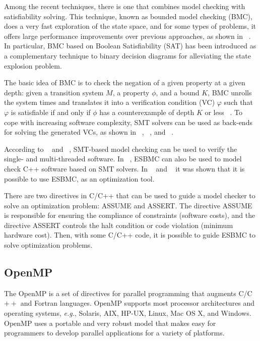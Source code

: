 Among the recent techniques, there is one that combines model checking with satisﬁability solving. This technique, known as bounded model checking (BMC), does a very fast exploration of the state space, and for some types of problems, it offers large performance improvements over previous approaches, as shown in ~\cite{Biere2009}. In particular, BMC based on Boolean Satisfiability (SAT) has been introduced as a complementary technique to binary decision diagrams for alleviating the state explosion problem. 

The basic idea of BMC is to check the negation of a given property at a given depth: given a transition system $ M $, a property $ \phi $, and a bound $ K $, BMC unrolls the system  times and translates it into a verification condition (VC) $ \varphi $  such that $ \varphi $   is satisfiable if and only if $ \phi $ has a counterexample of depth $ K $ or less ~\cite{Biere2009}. To cope with increasing software complexity, SMT solvers can be used as back-ends for solving the generated VCs, as shown in ~\cite{Clarke2004}, ~\cite{Armando2009}, and ~\cite{Ganai2006}. 

According to ~\cite{Cordeiro2012} and ~\cite{Cordeiro2011}, SMT-based model checking can be used to verify the single- and multi-threaded software. In ~\cite{Ramalho2013}, ESBMC can also be used to model check C++ software based on SMT solvers. In ~\cite{Trindade2015} and ~\cite{Trindade2014} it was shown that it is possible to use ESBMC, as an optimization tool.

There are two directives in C/C++ that can be used to guide a model checker to solve an optimization problem: ASSUME and ASSERT. The directive ASSUME is responsible for ensuring the compliance of constraints (software costs), and the directive ASSERT controls the halt condition or code violation (minimum hardware cost). Then, with some C/C++ code, it is possible to guide ESBMC to solve optimization problems.

\subsection{OpenMP}
\label{OpenMP}
The OpenMP is a set of directives for parallel programming that augments C/C$++$ and Fortran languages. OpenMP supports most processor architectures and operating systems, {\it e.g.}, Solaris, AIX, HP-UX, Linux, Mac OS X, and Windows. OpenMP uses a portable and very robust model that makes easy for programmers to develop parallel applications for a variety of platforms. 

